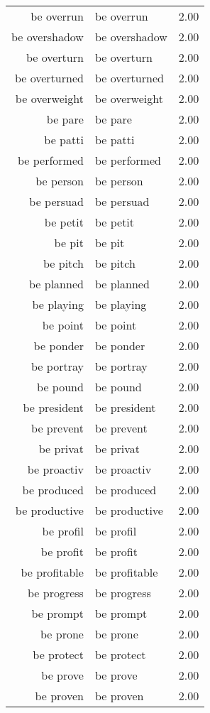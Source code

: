 \begin{table}[ht]
\begin{tabular}{rlr}
  be overrun & be overrun & 2.00 \\ 
  be overshadow & be overshadow & 2.00 \\ 
  be overturn & be overturn & 2.00 \\ 
  be overturned & be overturned & 2.00 \\ 
  be overweight & be overweight & 2.00 \\ 
  be pare & be pare & 2.00 \\ 
  be patti & be patti & 2.00 \\ 
  be performed & be performed & 2.00 \\ 
  be person & be person & 2.00 \\ 
  be persuad & be persuad & 2.00 \\ 
  be petit & be petit & 2.00 \\ 
  be pit & be pit & 2.00 \\ 
  be pitch & be pitch & 2.00 \\ 
  be planned & be planned & 2.00 \\ 
  be playing & be playing & 2.00 \\ 
  be point & be point & 2.00 \\ 
  be ponder & be ponder & 2.00 \\ 
  be portray & be portray & 2.00 \\ 
  be pound & be pound & 2.00 \\ 
  be president & be president & 2.00 \\ 
  be prevent & be prevent & 2.00 \\ 
  be privat & be privat & 2.00 \\ 
  be proactiv & be proactiv & 2.00 \\ 
  be produced & be produced & 2.00 \\ 
  be productive & be productive & 2.00 \\ 
  be profil & be profil & 2.00 \\ 
  be profit & be profit & 2.00 \\ 
  be profitable & be profitable & 2.00 \\ 
  be progress & be progress & 2.00 \\ 
  be prompt & be prompt & 2.00 \\ 
  be prone & be prone & 2.00 \\ 
  be protect & be protect & 2.00 \\ 
  be prove & be prove & 2.00 \\ 
  be proven & be proven & 2.00 \\ 

\end{tabular}
\end{table}
